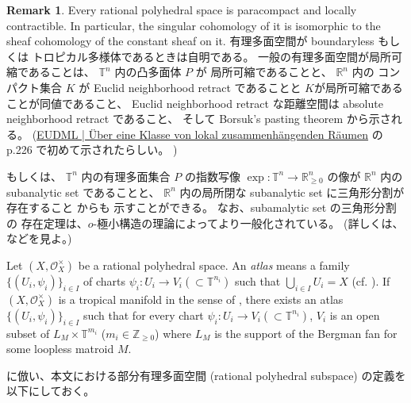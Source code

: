 \documentclass[a4paper,dvipdfmx,reqno,12pt]{amsart}
\theoremstyle{definition}
\newtheorem{remark}[theorem]{Remark}
\newcommand{\opn}[1]{\operatorname{#1}}
\numberwithin{equation}{section}
\begin{document}
\begin{remark}
Every rational polyhedral space
is paracompact and locally contractible.
In particular, the singular cohomology of it 
is isomorphic to the sheaf cohomology of
the constant sheaf on it.
有理多面空間が
boundaryless もしくは
トロピカル多様体であるときは自明である。
一般の有理多面空間が局所可縮であることは、
$\mathbb{T}^{n}$ 内の凸多面体 $P$ が
局所可縮であることと、
$\mathbb{R}^{n}$ 内の コンパクト集合 $K$ が Euclid 
neighborhood retract であることと
$K$が局所可縮であることが同値であること、
Euclid neighborhood retract な距離空間は
absolute neighborhood retract であること、
そして Borsuk's pasting theorem から示される。
(\href{https://eudml.org/doc/212574}{EUDML | Über eine Klasse von lokal zusammenhängenden Räumen}
の p.226 で初めて示されたらしい。
)

もしくは、
$\mathbb{T}^{n}$ 内の有理多面集合 $P$ の指数写像
$\opn{exp}\colon \mathbb{T}^{n}\to 
\mathbb{R}^{n}_{\geq 0}$ の像が $\mathbb{R}^{n}$
内の subanalytic set であることと、
$\mathbb{R}^{n}$ 内の局所閉な
subanalytic set に三角形分割が存在すること
\cite{MR760983} からも
示すことができる。
なお、subamalytic set の三角形分割の
存在定理は、$o$-極小構造の理論によってより一般化されている。
(詳しくは、\cite[Theorem II]{MR1463945} などを見よ。)
\end{remark}
Let $(X,\mathcal{O}_X^{\times})$ be a rational polyhedral space.
An \emph{atlas} means a family 
$\{(U_i,\psi_i)\}_{i\in I}$ of charts 
$\psi_i\colon U_i\to V_i (\subset \mathbb{T}^{n_i})$
\cite[Definition 2.2]{MR4637248}
such that $\bigcup_{i\in I}U_i=X$ 
(cf. \cite[Definition 2.3]{demedrano2023chern}).
If $(X,\mathcal{O}_X^{\times})$ is a tropical manifold
in the sense of \cite[Definition 6.1]{gross2019sheaftheoretic},
there exists an atlas $\{(U_i,\psi_i)\}_{i\in I}$
such that for every chart $\psi_i \colon U_i \to V_i 
(\subset \mathbb{T}^{n_i})$,
$V_i$ is an open subset of $L_M\times \mathbb{T}^{m_i}$
($m_i\in \mathbb{Z}_{\geq 0}$) where 
$L_M$ is the support of
the Bergman fan for some loopless matroid $M$. 


\cite[Definition 2.14]{demedrano2023chern}
に倣い、本文における部分有理多面空間
(rational polyhedral subspace)
の定義を以下にしておく。
\end{document}
